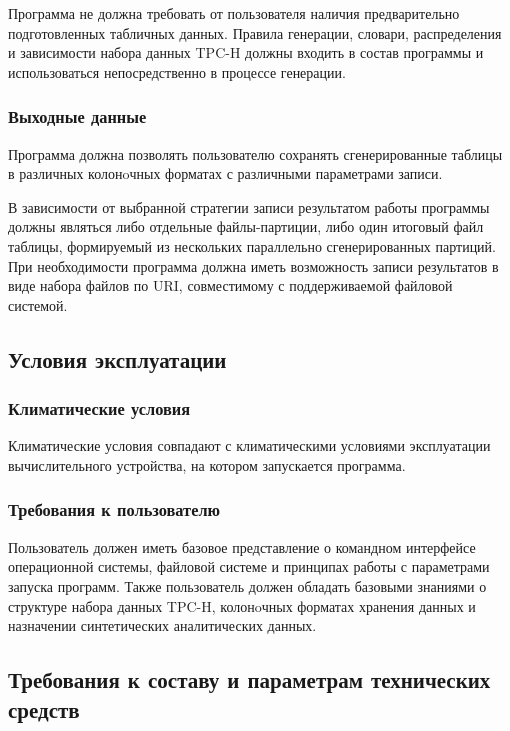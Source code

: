 \documentclass{../TechDoc}
\begin{document}
    Программа не должна требовать от пользователя наличия предварительно подготовленных табличных данных. Правила генерации, словари, распределения и зависимости набора данных TPC-H должны входить в состав программы и использоваться непосредственно в процессе генерации.

    \subsubsection{Выходные данные}
    
    Программа должна позволять пользователю сохранять сгенерированные таблицы в различных колонoчных форматах с различными параметрами записи.
    
    В зависимости от выбранной стратегии записи результатом работы программы должны являться либо отдельные файлы-партиции, либо один итоговый файл таблицы, формируемый из нескольких параллельно сгенерированных партиций. При необходимости программа должна иметь возможность записи результатов в виде набора файлов по URI, совместимому с поддерживаемой файловой системой.
    
    \subsection{Условия эксплуатации}
    
    \subsubsection{Климатические условия}
    
    Климатические условия совпадают с климатическими условиями эксплуатации вычислительного устройства, на котором запускается программа.

    \subsubsection{Требования к пользователю}
    
    Пользователь должен иметь базовое представление о командном интерфейсе операционной системы, файловой системе и принципах работы с параметрами запуска программ. Также пользователь должен обладать базовыми знаниями о структуре набора данных TPC-H, колонoчных форматах хранения данных и назначении синтетических аналитических данных.

    \subsection{Требования к составу и параметрам технических средств}
    
\end{document}
